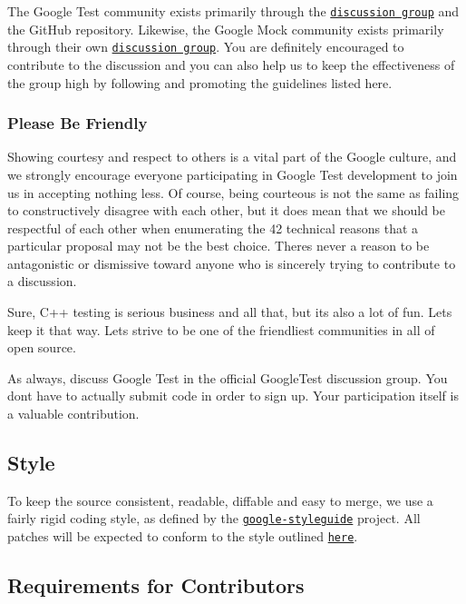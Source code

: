 The Google Test community exists primarily through the \href{http://groups.google.com/group/googletestframework}{\tt discussion group} and the Git\+Hub repository. Likewise, the Google Mock community exists primarily through their own \href{http://groups.google.com/group/googlemock}{\tt discussion group}. You are definitely encouraged to contribute to the discussion and you can also help us to keep the effectiveness of the group high by following and promoting the guidelines listed here.

\subsubsection*{Please Be Friendly}

Showing courtesy and respect to others is a vital part of the Google culture, and we strongly encourage everyone participating in Google Test development to join us in accepting nothing less. Of course, being courteous is not the same as failing to constructively disagree with each other, but it does mean that we should be respectful of each other when enumerating the 42 technical reasons that a particular proposal may not be the best choice. There\textquotesingle{}s never a reason to be antagonistic or dismissive toward anyone who is sincerely trying to contribute to a discussion.

Sure, C++ testing is serious business and all that, but it\textquotesingle{}s also a lot of fun. Let\textquotesingle{}s keep it that way. Let\textquotesingle{}s strive to be one of the friendliest communities in all of open source.

As always, discuss Google Test in the official Google\+Test discussion group. You don\textquotesingle{}t have to actually submit code in order to sign up. Your participation itself is a valuable contribution.

\subsection*{Style}

To keep the source consistent, readable, diffable and easy to merge, we use a fairly rigid coding style, as defined by the \href{https://github.com/google/styleguide}{\tt google-\/styleguide} project. All patches will be expected to conform to the style outlined \href{https://google.github.io/styleguide/cppguide.html}{\tt here}.

\subsection*{Requirements for Contributors}


